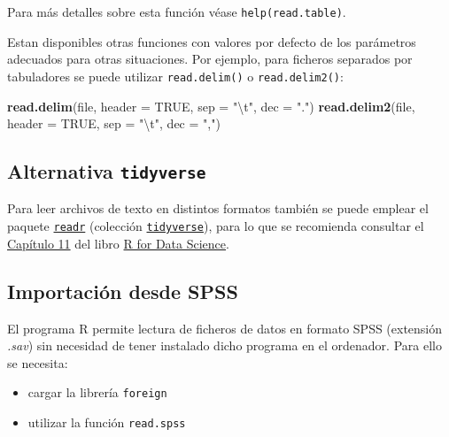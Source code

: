\documentclass[
]{book}
\newenvironment{Shaded}{\begin{snugshade}}{\end{snugshade}}
\newcommand{\CharTok}[1]{\textcolor[rgb]{0.31,0.60,0.02}{#1}}
\newcommand{\DataTypeTok}[1]{\textcolor[rgb]{0.13,0.29,0.53}{#1}}
\newcommand{\KeywordTok}[1]{\textcolor[rgb]{0.13,0.29,0.53}{\textbf{#1}}}
\newcommand{\NormalTok}[1]{#1}
\newcommand{\OtherTok}[1]{\textcolor[rgb]{0.56,0.35,0.01}{#1}}
\newcommand{\StringTok}[1]{\textcolor[rgb]{0.31,0.60,0.02}{#1}}
\begin{document}
Para más detalles sobre esta función véase
\texttt{help(read.table)}.

Estan disponibles otras funciones con valores por defecto de los parámetros
adecuados para otras situaciones. Por ejemplo, para ficheros separados por tabuladores
se puede utilizar \texttt{read.delim()} o \texttt{read.delim2()}:

\begin{Shaded}
\begin{Highlighting}[]
\KeywordTok{read.delim}\NormalTok{(file, }\DataTypeTok{header =} \OtherTok{TRUE}\NormalTok{, }\DataTypeTok{sep =} \StringTok{"}\CharTok{\textbackslash{}t}\StringTok{"}\NormalTok{, }\DataTypeTok{dec =} \StringTok{"."}\NormalTok{)}
\KeywordTok{read.delim2}\NormalTok{(file, }\DataTypeTok{header =} \OtherTok{TRUE}\NormalTok{, }\DataTypeTok{sep =} \StringTok{"}\CharTok{\textbackslash{}t}\StringTok{"}\NormalTok{, }\DataTypeTok{dec =} \StringTok{","}\NormalTok{)}
\end{Highlighting}
\end{Shaded}

\hypertarget{alternativa-tidyverse}{%
\subsection{\texorpdfstring{Alternativa \texttt{tidyverse}}{Alternativa tidyverse}}\label{alternativa-tidyverse}}

Para leer archivos de texto en distintos formatos también se puede emplear el paquete \href{https://readr.tidyverse.org}{\texttt{readr}}
(colección \href{https://www.tidyverse.org/}{\texttt{tidyverse}}), para lo que se recomienda
consultar el \href{https://r4ds.had.co.nz/data-import.html}{Capítulo 11} del libro \href{http://r4ds.had.co.nz}{R for Data Science}.

\hypertarget{importaciuxf3n-desde-spss}{%
\subsection{Importación desde SPSS}\label{importaciuxf3n-desde-spss}}

El programa R permite
lectura de ficheros de datos en formato SPSS (extensión \emph{.sav}) sin
necesidad de tener instalado dicho programa en el ordenador. Para ello
se necesita:

\begin{itemize}
\item
  cargar la librería \texttt{foreign}
\item
  utilizar la función \texttt{read.spss}
\end{itemize}
\end{document}
